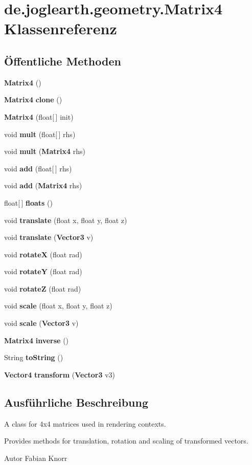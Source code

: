 \section{de.\-joglearth.\-geometry.\-Matrix4 \-Klassenreferenz}
\label{classde_1_1joglearth_1_1geometry_1_1_matrix4}
\subsection*{Öffentliche \-Methoden}
\begin{DoxyCompactItemize}
\item 
{\bf \-Matrix4} ()
\item 
{\bf \-Matrix4} {\bf clone} ()
\item 
{\bf \-Matrix4} (float[$\,$] init)
\item 
void {\bf mult} (float[$\,$] rhs)
\item 
void {\bf mult} ({\bf \-Matrix4} rhs)
\item 
void {\bf add} (float[$\,$] rhs)
\item 
void {\bf add} ({\bf \-Matrix4} rhs)
\item 
float[$\,$] {\bf floats} ()
\item 
void {\bf translate} (float x, float y, float z)
\item 
void {\bf translate} ({\bf \-Vector3} v)
\item 
void {\bf rotate\-X} (float rad)
\item 
void {\bf rotate\-Y} (float rad)
\item 
void {\bf rotate\-Z} (float rad)
\item 
void {\bf scale} (float x, float y, float z)
\item 
void {\bf scale} ({\bf \-Vector3} v)
\item 
{\bf \-Matrix4} {\bf inverse} ()
\item 
\-String {\bf to\-String} ()
\item 
{\bf \-Vector4} {\bf transform} ({\bf \-Vector3} v3)
\end{DoxyCompactItemize}


\subsection{\-Ausführliche \-Beschreibung}
\-A class for 4x4 matrices used in rendering contexts.

\-Provides methods for translation, rotation and scaling of transformed vectors. \begin{DoxyAuthor}{\-Autor}
\-Fabian \-Knorr 
\end{DoxyAuthor}


